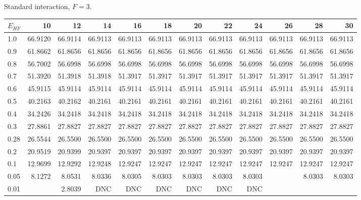 \begin{landscape}
\begin{table}
\begin{center}
Standard interaction, $F=3$.\\
\begin{tabular}{l|rrrrrrrrrrr}
\hline 
$E_{HF}$ & 10 & 12 & 14 & 16 & 18 & 20 & 22 & 24 & 26 & 28 & 30 \\
\hline \hline
1.0 & 66.9120 & 66.9114 & 66.9113 & 66.9113 & 66.9113 & 66.9113 & 66.9113 & 66.9113 & 66.9113  & 66.9113 & 66.9113 \\ 
0.9 & 61.8662 & 61.8656 & 61.8656 & 61.8656 & 61.8656 & 61.8656 & 61.8656 & 61.8656 & 61.8656  & 61.8656 & 61.8656 \\ 
0.8 & 56.7002 & 56.6998 & 56.6998 & 56.6998 & 56.6998 & 56.6998 & 56.6998 & 56.6998 & 56.6998  & 56.6998 & 56.6998 \\ 
0.7 & 51.3920 & 51.3918 & 51.3918 & 51.3917 & 51.3917 & 51.3917 & 51.3917 & 51.3917 & 51.3917  & 51.3917 & 51.3917 \\ 
0.6 & 45.9115 & 45.9114 & 45.9114 & 45.9114 & 45.9114 & 45.9114 & 45.9114 & 45.9114 & 45.9114  & 45.9114 & 45.9114 \\ 
0.5 & 40.2163 & 40.2162 & 40.2161 & 40.2161 & 40.2161 & 40.2161 & 40.2161 & 40.2161 & 40.2161  & 40.2161 & 40.2161 \\ 
0.4 & 34.2426 & 34.2418 & 34.2418 & 34.2418 & 34.2418 & 34.2418 & 34.2418 & 34.2418 & 34.2418  & 34.2418 & 34.2418 \\ 
0.3 & 27.8861 & 27.8827 & 27.8827 & 27.8827 & 27.8827 & 27.8827 & 27.8827 & 27.8827 & 27.8827  & 27.8827 & 27.8827 \\ 
0.28& 26.5544 & 26.5500 & 26.5500 & 26.5500 & 26.5500 & 26.5500 & 26.5500 & 26.5500 & 26.5500  & 26.5500 & 26.5500 \\ 
0.2 & 20.9519 & 20.9399 & 20.9397 & 20.9397 & 20.9397 & 20.9397 & 20.9397 & 20.9397 & 20.9397  & 20.9397 & 20.9397 \\ 
0.1 & 12.9699 & 12.9292 & 12.9248 & 12.9247 & 12.9247 & 12.9247 & 12.9247 & 12.9247 & 12.9247  & 12.9247 & 12.9247 \\ 
0.05&  8.1272 &  8.0531 &  8.0336 &  8.0305 &  8.0303 &  8.0303 &  8.0303 &  8.0303 &          &  8.0303 &  8.0303 \\
0.01&  	      &  2.8039 & DNC     & DNC     & DNC     & DNC     &   DNC   & DNC     &  \\ 
\hline \hline
\end{tabular}
\end{center}
\begin{center}

\end{center}
\end{table}
\end{landscape}
